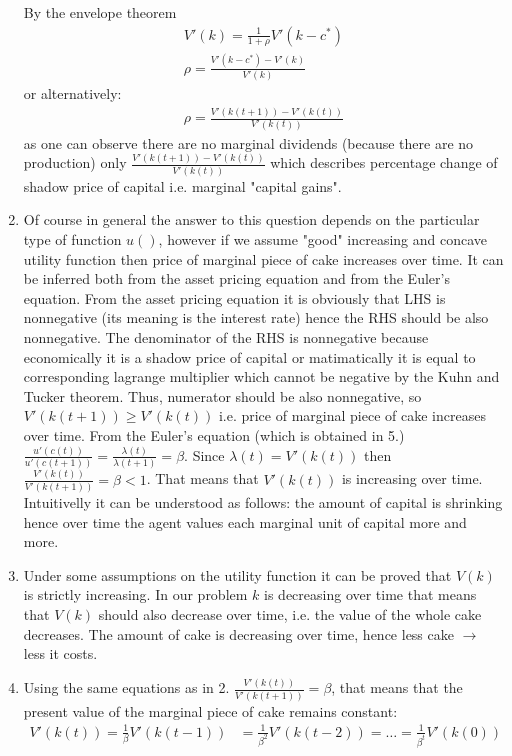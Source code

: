 \documentclass[a4paper]{article}
\begin{document}
\begin{enumerate}
	
	By the envelope theorem
	\begin{align*}
	V'(k) = \frac{1}{1+\rho}V'(k-c^*)\\
	\rho = \frac{V'(k-c^*) - V'(k)}{V'(k)}
	\end{align*}
	or alternatively:
	\begin{align*}
	\rho = \frac{V'(k(t+1)) - V'(k(t))}{V'(k(t))}
	\end{align*}
	as one can observe there are no marginal dividends (because there are no production) only $\frac{V'(k(t+1)) - V'(k(t))}{V'(k(t))}$ which describes percentage change of shadow price of capital i.e. marginal "capital gains". 
	\item Of course in general the answer to this question depends on the particular type of function $u()$, however if we assume "good" increasing and concave utility function then price of marginal piece of cake increases over time. It can be inferred both from the asset pricing equation and from the Euler's equation. From the asset pricing equation it is obviously that LHS is nonnegative (its meaning is the interest rate) hence the RHS should be also nonnegative. The denominator of the RHS is nonnegative because economically it is a shadow price of capital or matimatically it is equal to corresponding lagrange multiplier which cannot be negative by the Kuhn and Tucker theorem. Thus, numerator should be also nonnegative, so $V'(k(t+1)) \ge V'(k(t))$ i.e. price of marginal piece of cake increases over time. From the Euler's equation (which is obtained in 5.) $\frac{u'(c(t))}{u'(c(t+1))} = \frac{\lambda(t)}{\lambda(t+1)} = \beta$. Since $\lambda(t) = V'(k(t))$ then $\frac{V'(k(t))}{V'(k(t+1))} = \beta < 1$. That means that $V'(k(t))$ is increasing over time. Intuitivelly it can be understood as follows: the amount of capital is shrinking hence over time the agent values each marginal unit of capital more and more. 
	\item Under some assumptions on the utility function it can be proved that $V(k)$ is strictly increasing. In our problem $k$ is decreasing over time that means that $V(k)$ should also decrease over time, i.e. the value of the whole cake decreases. The amount of cake is decreasing over time, hence less cake $\to$ less it costs.
	\item Using the same equations as in 2. $\frac{V'(k(t))}{V'(k(t+1))} = \beta$, that means that the present value of the marginal piece of cake remains constant: \begin{align*}
	V'(k(t)) = \frac{1}{\beta}V'(k(t-1)) &= \frac{1}{\beta^2}V'(k(t-2)) = \dots = \frac{1}{\beta^t}V'(k(0))\\

\end{align*}
\end{enumerate}
\end{document}
